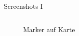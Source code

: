 \documentclass{beamer}
\begin{document}
\begin{frame}{Screenshots I}
\begin{columns}[onlytextwidth]
			\begin{column}{0.5\textwidth}
				\centering
				\begin{figure}
					\caption{Marker auf Karte}
				\end{figure}
			\end{column}
		
		\end{columns}
	\end{frame}
	
\end{document}
